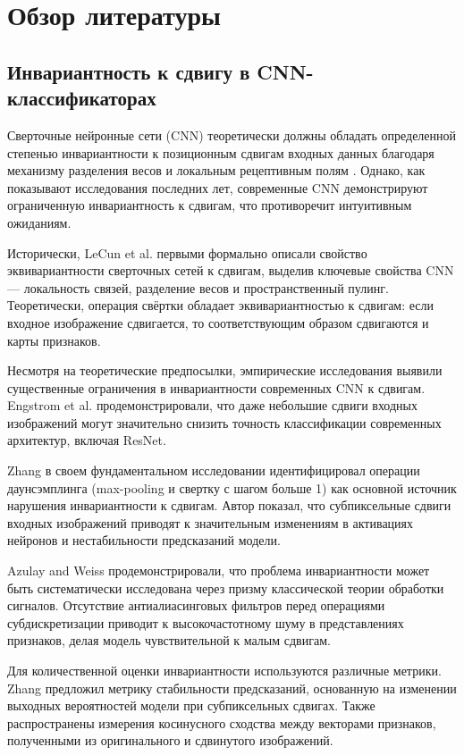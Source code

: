 \section{Обзор литературы} 
\label{review}

\subsection{Инвариантность к сдвигу в CNN-классификаторах}
\label{review:invariance}

Сверточные нейронные сети (CNN) теоретически должны обладать определенной степенью инвариантности к позиционным сдвигам входных данных благодаря механизму разделения весов и локальным рецептивным полям \cite{Zhang2019blurpool}. Однако, как показывают исследования последних лет, современные CNN демонстрируют ограниченную инвариантность к сдвигам, что противоречит интуитивным ожиданиям.

Исторически, LeCun et al. \cite{Zhang2019blurpool} первыми формально описали свойство эквивариантности сверточных сетей к сдвигам, выделив ключевые свойства CNN — локальность связей, разделение весов и пространственный пулинг. Теоретически, операция свёртки обладает эквивариантностью к сдвигам: если входное изображение сдвигается, то соответствующим образом сдвигаются и карты признаков.

Несмотря на теоретические предпосылки, эмпирические исследования выявили существенные ограничения в инвариантности современных CNN к сдвигам. Engstrom et al. \cite{engstrom2019exploring} продемонстрировали, что даже небольшие сдвиги входных изображений могут значительно снизить точность классификации современных архитектур, включая ResNet.

Zhang \cite{Zhang2019blurpool} в своем фундаментальном исследовании идентифицировал операции даунсэмплинга (max-pooling и свертку с шагом больше 1) как основной источник нарушения инвариантности к сдвигам. Автор показал, что субпиксельные сдвиги входных изображений приводят к значительным изменениям в активациях нейронов и нестабильности предсказаний модели.

Azulay and Weiss \cite{azulay2019deep} продемонстрировали, что проблема инвариантности может быть систематически исследована через призму классической теории обработки сигналов. Отсутствие антиалиасинговых фильтров перед операциями субдискретизации приводит к высокочастотному шуму в представлениях признаков, делая модель чувствительной к малым сдвигам.

Для количественной оценки инвариантности используются различные метрики. Zhang \cite{Zhang2019blurpool} предложил метрику стабильности предсказаний, основанную на изменении выходных вероятностей модели при субпиксельных сдвигах. Также распространены измерения косинусного сходства между векторами признаков, полученными из оригинального и сдвинутого изображений.

